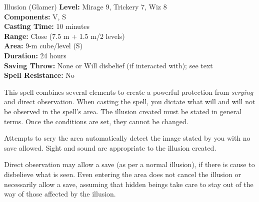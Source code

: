 {Illusion (Glamer)}
{
	\textbf{Level:}
	Mirage 9, Trickery 7, Wiz 8\\
	\textbf{Components:}
	V, S\\
	\textbf{Casting Time:}
	10 minutes\\
	\textbf{Range:}
	Close (7.5 m + 1.5 m/2 levels)\\
	\textbf{Area:}
	9-m cube/level (S)\\
	\textbf{Duration:}
	24 hours\\
	\textbf{Saving Throw:}
	None or Will disbelief (if interacted with); see text\\
	\textbf{Spell Resistance:}
	No\\
}
{
	This spell combines several elements to create a powerful protection from \emph{scrying} and direct observation. When casting the spell, you dictate what will and will not be observed in the spell's area. The illusion created must be stated in general terms. Once the conditions are set, they cannot be changed.

	Attempts to scry the area automatically detect the image stated by you with no save allowed. Sight and sound are appropriate to the illusion created.

	Direct observation may allow a save (as per a normal illusion), if there is cause to disbelieve what is seen. Even entering the area does not cancel the illusion or necessarily allow a save, assuming that hidden beings take care to stay out of the way of those affected by the illusion.

}
